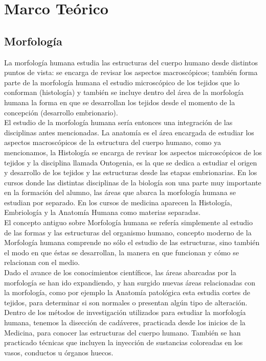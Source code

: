 \chapter{Marco Teórico}

\section{Morfología}
La morfología humana estudia las estructuras del cuerpo humano desde distintos 
puntos de vista: se encarga de revisar los aspectos macroscópicos; 
también forma parte de la morfología humana el estudio microscópico
de los tejidos que lo conforman (histología) y también se incluye dentro del 
área de la morfología humana la forma en que se 
desarrollan los tejidos desde el momento de la concepción (desarrollo embrionario).\\
El estudio de la morfología humana sería entonces una integración de 
las disciplinas antes mencionadas. La anatomía es el área encargada de estudiar los 
aspectos macroscópicos de la estructura del cuerpo humano, como ya mencionamos,
la Histología se encarga de revisar los aspectos microscópicos de los tejidos 
y la disciplina llamada Ontogenia, es la que se dedica a estudiar el origen 
y desarrollo de los tejidos y las estructuras desde las etapas embrionarias.
En los cursos donde las distintas disciplinas de la biología son una parte muy importante en la formación del alumno, las áreas que abarca la morfología 
humana se estudian por separado. En los cursos de medicina aparecen la Histología, Embriología y la Anatomía Humana como materias separadas.\\
El concepto antiguo sobre Morfología humana se refería simplemente al estudio de las formas y  las estructuras del organismo humano, 
concepto moderno de la Morfología humana comprende no sólo el estudio de las estructuras, sino también el modo en que éstas se desarrollan, 
la manera en que funcionan y cómo se relacionan con el medio.\\
Dado el avance de los conocimientos científicos, las áreas abarcadas por la morfología se han ido expandiendo, y han surgido nuevas áreas relacionadas con la morfología, 
como por ejemplo la Anatomía patológica esta estudia cortes de tejidos, para determinar  si son normales o presentan algún tipo de alteración.\\
Dentro de los métodos de investigación utilizados para estudiar la morfología humana, tenemos la disección de cadáveres, practicada desde los inicios de la Medicina, 
para conocer las estructuras del cuerpo humano. También se han practicado técnicas que incluyen la inyección de sustancias coloreadas en los vasos, conductos u órganos huecos. 
